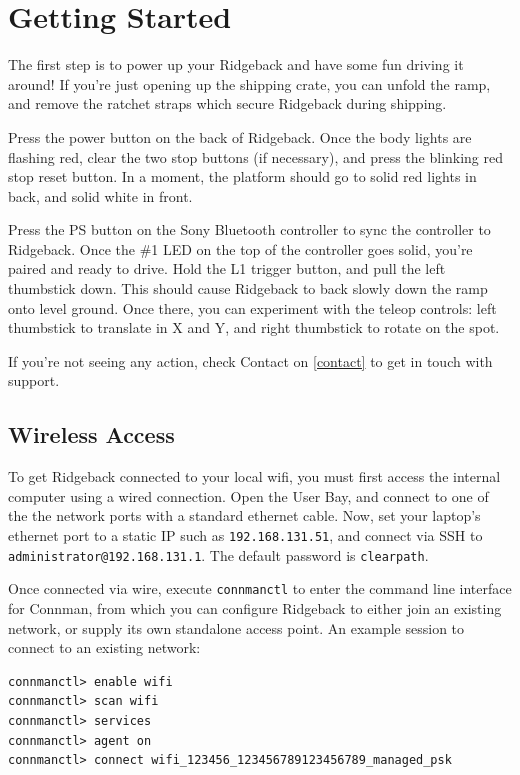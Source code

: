 \documentclass[]{clearpath-latex/clearpath-manual}
\begin{document}
\section{Getting Started}

The first step is to power up your Ridgeback and have some fun driving it around! If you’re just opening up the shipping crate, you can unfold the ramp, and remove the ratchet straps which secure Ridgeback during shipping.

Press the power button on the back of Ridgeback. Once the body lights are flashing red, clear the two stop buttons (if necessary), and press the blinking red stop reset button. In a moment, the platform should go to solid red lights in back, and solid white in front.

Press the PS button on the Sony Bluetooth controller to sync the controller to Ridgeback. Once the \#1 LED on the top of the controller goes solid, you’re paired and ready to drive. Hold the L1 trigger button, and pull the left thumbstick down. This should cause Ridgeback to back slowly down the ramp onto level ground. Once there, you can experiment with the teleop controls: left thumbstick to translate in X and Y, and right thumbstick to rotate on the spot.

If you’re not seeing any action, check Contact on \autoref{contact} to get in touch with support.

\subsection{Wireless Access}

To get Ridgeback connected to your local wifi, you must first access the internal computer using a wired connection. Open the User Bay, and connect to one of the the network ports with a standard ethernet cable. Now, set your laptop’s ethernet port to a static IP such as \lstinline{192.168.131.51}, and connect via SSH to \lstinline{administrator@192.168.131.1}. The default password is \lstinline{clearpath}.

Once connected via wire, execute \lstinline{connmanctl} to enter the command line interface for Connman, from which you can configure Ridgeback to either join an existing network, or supply its own standalone access point. An example session to connect to an existing network:

\begin{lstlisting}
connmanctl> enable wifi
connmanctl> scan wifi
connmanctl> services
connmanctl> agent on
connmanctl> connect wifi_123456_123456789123456789_managed_psk
\end{lstlisting}
\end{document}
